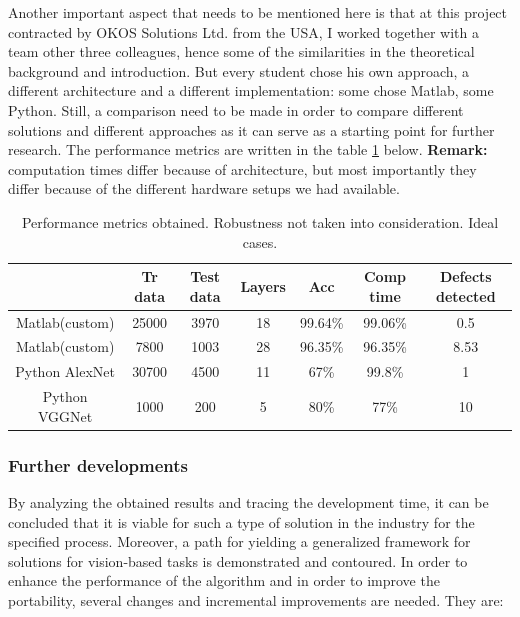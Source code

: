 \documentclass[12pt,a4paper,twoside]{report}
\begin{document}
Another important aspect that needs to be mentioned here is that at this project contracted by OKOS Solutions Ltd. from the USA, I worked together with a team other three colleagues, hence some of the similarities in the theoretical background and introduction. But every student chose his own approach, a different architecture and a different implementation: some chose Matlab, some Python. Still, a comparison need to be made in order to compare different solutions and different approaches as it can serve as a starting point for further research. The performance metrics are written in the table \ref{tab:toti} below. \textbf{Remark:} computation times differ because of architecture, but most importantly they differ because of the different hardware setups we had available.

\begin{table}[H]
\label{tab:toti}
 \begin{tabular}{|c |c| c | c| c| c| c|} 
 \hline
  & Tr data &  Test data & Layers & Acc & Comp time & Defects detected\\ 
 \hline
 Matlab(custom) & 25000 & 3970 & 18 & 99.64\% & 99.06\% & 0.5 \\ 
 \hline
 Matlab(custom) & 7800 & 1003 & 28 & 96.35\% & 96.35\% & 8.53 \\
  \hline
 Python AlexNet & 30700 & 4500 & 11 & 67\% & 99.8\% & 1 \\ 
 \hline
 Python VGGNet & 1000 & 200 & 5 & 80\% & 77\% & 10 \\
 \hline
 \end{tabular}
\caption{Performance metrics obtained. Robustness not taken into consideration. Ideal cases.}
\end{table}
\par



\subsubsection{Further developments}
By analyzing the obtained results and tracing the development time, it can be concluded that it is viable for such a type of solution in the industry for the specified process. Moreover, a path for yielding a generalized framework for solutions for vision-based tasks is demonstrated and contoured. In order to enhance the performance of the algorithm and in order to improve the portability, several changes and incremental improvements are needed. They are:
\end{document}
